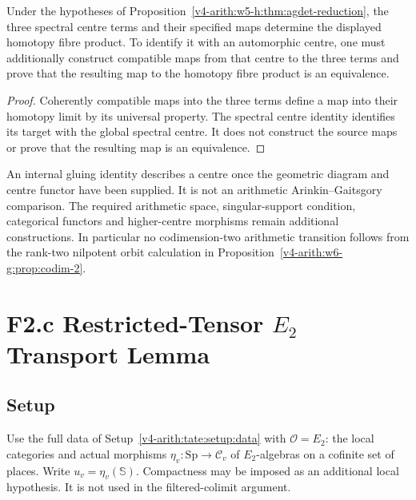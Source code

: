 \begin{corollary}
\label{v4-arith:w5-h:cor:agdet-residual}
Under the hypotheses of
Proposition~\ref{v4-arith:w5-h:thm:agdet-reduction}, the three spectral
centre terms and their specified maps determine the displayed
homotopy fibre product. To identify it with an automorphic centre,
one must additionally construct compatible maps from that centre
to the three terms and prove that the resulting map to the
homotopy fibre product is an equivalence.
\end{corollary}

\begin{proof}
Coherently compatible maps into the three terms define a map into
their homotopy limit by its universal property.
The spectral centre identity identifies its target with the global
spectral centre. It does not construct the source maps or prove
that the resulting map is an equivalence.
\end{proof}

\begin{remark}
\label{v4-arith:w5-h:rem:agdet-full-ag-removal}
An internal gluing identity describes a centre once the geometric
diagram and centre functor have been supplied. It is not an
arithmetic Arinkin--Gaitsgory comparison. The required arithmetic
space, singular-support condition, categorical functors and
higher-centre morphisms remain additional constructions.
In particular no codimension-two arithmetic transition follows
from the rank-two nilpotent orbit calculation in
Proposition~\ref{v4-arith:w6-g:prop:codim-2}.
\end{remark}

\section{F2.c Restricted-Tensor \(E_2\) Transport Lemma}
\label{v4-arith:w5-h:f2c}

\subsection{Setup}

Use the full data of Setup~\ref{v4-arith:tate:setup:data} with
\(\mathcal O=E_2\): the local categories and actual morphisms
\(\eta_v:\mathrm{Sp}\to\mathcal C_v\) of \(E_2\)-algebras
on a cofinite set of places. Write \(u_v=\eta_v(\mathbb S)\).
Compactness may be imposed as an additional local hypothesis.
It is not used in the filtered-colimit argument.

